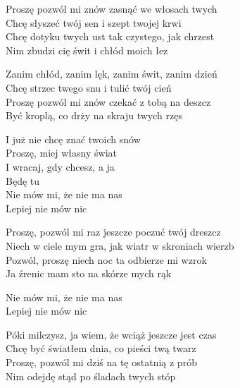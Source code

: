 \begin{text}
    Proszę pozwól mi znów zasnąć we włosach twych\\
    Chcę słyszeć twój sen i szept twojej krwi\\
    Chcę dotyku twych ust tak czystego, jak chrzest\\
    Nim zbudzi cię świt i chłód moich łez

    Zanim chłód, zanim lęk, zanim świt, zanim dzień\\
    Chcę strzec twego snu i tulić twój cień\\
    Proszę pozwól mi znów czekać z tobą na deszcz\\
    Być kroplą, co drży na skraju twych rzęs

    I już nie chcę znać twoich snów\\
    Proszę, miej własny świat\\
    I wracaj, gdy chcesz, a ja\\
    Będę tu\\
    Nie mów mi, że nie ma nas\\
    Lepiej nie mów nic

    Proszę, pozwól mi raz jeszcze poczuć twój dreszcz\\
    Niech w ciele mym gra, jak wiatr w skroniach wierzb\\
    Pozwól, proszę niech noc ta odbierze mi wzrok\\
    Ja źrenic mam sto na skórze mych rąk

    Nie mów mi, że nie ma nas\\
    Lepiej nie mów nic

    Póki milczysz, ja wiem, że wciąż jeszcze jest czas\\
    Chcę być światłem dnia, co pieści twą twarz\\
    Proszę, pozwól mi dziś na tę ostatnią z prób\\
    Nim odejdę stąd po śladach twych stóp
\end{text}
\begin{chord}

\end{chord}